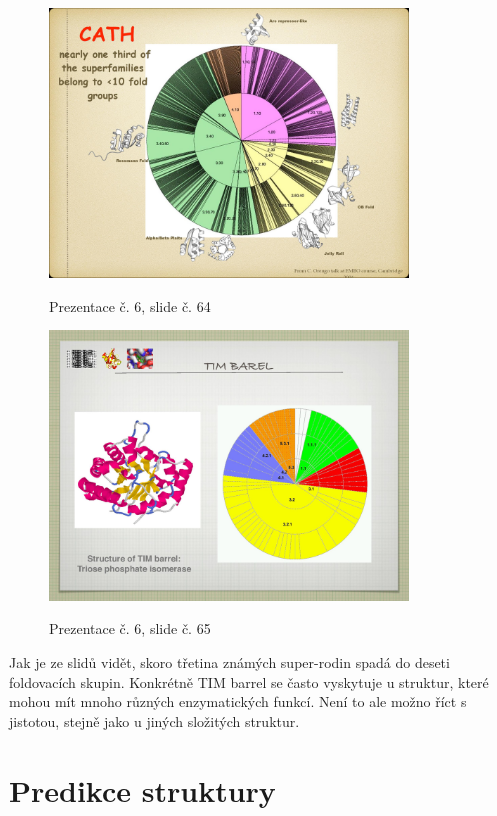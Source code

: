 \documentclass[DIV=8]{scrreprt}
\begin{document}
\begin{figure}
    \caption{Prezentace č. 6, slide č. 64}
    \includegraphics[width=0.85\textwidth]{slides-6/slide-64.jpg}
    \centering
    \label{slides-6-slide-64}
\end{figure}
\begin{figure}
    \caption{Prezentace č. 6, slide č. 65}
    \includegraphics[width=0.85\textwidth]{slides-6/slide-65.jpg}
    \centering
    \label{slides-6-slide-65}
\end{figure}

Jak je ze slidů vidět, skoro třetina známých super-rodin spadá do deseti foldovacích skupin. Konkrétně TIM barrel se často vyskytuje u struktur, které mohou mít mnoho různých enzymatických funkcí. Není to ale možno říct s jistotou, stejně jako u jiných složitých struktur.


\section{Predikce struktury} \label{Predikce struktury} \FloatBarrier
\end{document}

